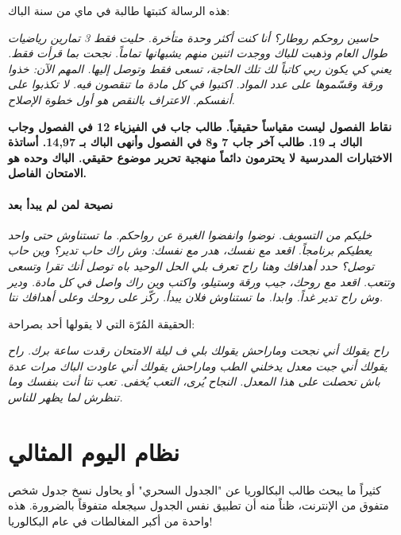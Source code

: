 \documentclass[12pt,a4paper]{book}
\newcommand{\quoteAr}[1]{%
	\begin{myquote}
		\itshape #1
	\end{myquote}
}
\newcommand{\importantAr}[1]{%
	\begin{important}
		\bfseries #1
	\end{important}
}
\begin{document}
	هذه الرسالة كتبتها طالبة في ماي من سنة الباك:
	
	\quoteAr{حاسين روحكم روطار؟ أنا كنت أكثر وحدة متأخرة. حليت فقط 3 تمارين رياضيات طوال العام وذهبت للباك ووجدت اثنين منهم يشبهانها تماماً. نجحت بما قرأت فقط. يعني كي يكون ربي كاتباً لك تلك الحاجة، تسعى فقط وتوصل إليها. المهم الآن: خذوا ورقة وقسّموها على عدد المواد. اكتبوا في كل مادة ما تنقصون فيه. لا تكذبوا على أنفسكم. الاعتراف بالنقص هو أول خطوة الإصلاح.}
	
	
	\importantAr{نقاط الفصول ليست مقياساً حقيقياً. طالب جاب في الفيزياء 12 في الفصول وجاب الباك بـ 19. طالب آخر جاب 7 و8 في الفصول وأنهى الباك بـ 14,97. أساتذة الاختبارات المدرسية لا يحترمون دائماً منهجية تحرير موضوع حقيقي. الباك وحده هو الامتحان الفاصل.}
	
	
	\subsubsection*{نصيحة لمن لم يبدأ بعد}
	
	\quoteAr{خليكم من التسويف. نوضوا وانفضوا الغبرة عن رواحكم. ما تستناوش حتى واحد يعطيكم برنامجاً. اقعد مع نفسك، هدر مع نفسك: وش راك حاب تدير؟ وين حاب توصل؟ حدد أهدافك وهنا راح تعرف بلي الحل الوحيد باه توصل أنك تقرا وتسعى وتتعب. اقعد مع روحك، جيب ورقة وستيلو، واكتب وين راك واصل في كل مادة. ودير \LR{Todo list} وش راح تدير غداً. وابدا. ما تستناوش فلان يبدأ. ركّز على روحك وعلى أهدافك نتا.}
	
	الحقيقة المُرّة التي لا يقولها أحد بصراحة:
	
	\quoteAr{راح يقولك أني نجحت وماراحش يقولك بلي ف ليلة الامتحان رقدت ساعة برك. راح يقولك أني جبت معدل يدخلني الطب وماراحش يقولك أني عاودت الباك مرات عدة باش تحصلت على هذا المعدل. النجاح يُرى، التعب يُخفى. تعب نتا أنت بنفسك وما تنظرش لما يظهر للناس.}
	
	
	
	
	
	
	
	
	\chapter{نظام اليوم المثالي}
	\label{chap:daily}
	
	
	كثيراً ما يبحث طالب البكالوريا عن "الجدول السحري" أو يحاول نسخ جدول شخص متفوق من الإنترنت، ظناً منه أن تطبيق نفس الجدول سيجعله متفوقاً بالضرورة. هذه واحدة من أكبر المغالطات في عام البكالوريا! 
	
\end{document}
